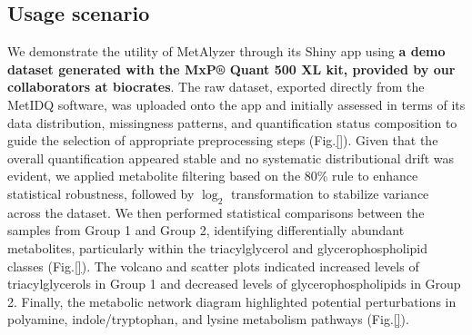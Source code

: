 \documentclass[12pt, a4paper]{article}
\begin{document}
\subsection*{\normalsize Usage scenario}
We demonstrate the utility of MetAlyzer through its Shiny app using \textbf{a demo dataset generated with the MxP® Quant 500 XL kit, provided by our collaborators at biocrates}. The raw dataset, exported directly from the MetIDQ software, was uploaded onto the app and initially assessed in terms of its data distribution, missingness patterns, and quantification status composition to guide the selection of appropriate preprocessing steps (Fig.\ref{}). Given that the overall quantification appeared stable and no systematic distributional drift was evident, we applied metabolite filtering based on the 80\% rule\cite{Wei2018} to enhance statistical robustness, followed by $\log_2$ transformation to stabilize variance across the dataset. We then performed statistical comparisons between the samples from Group 1 and Group 2, identifying differentially abundant metabolites, particularly within the triacylglycerol and glycerophospholipid classes (Fig.\ref{}). The volcano and scatter plots indicated increased levels of triacylglycerols in Group 1 and decreased levels of glycerophospholipids in Group 2. Finally, the metabolic network diagram highlighted potential perturbations in polyamine, indole/tryptophan, and lysine metabolism pathways (Fig.\ref{}).

\end{document}
